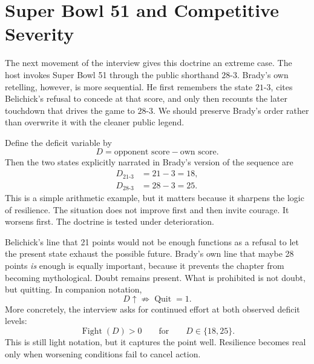 \section{Super Bowl 51 and Competitive Severity}

The next movement of the interview gives this doctrine an extreme case. The host invokes Super Bowl 51 through the public shorthand \(28\text{-}3\). Brady's own retelling, however, is more sequential. He first remembers the state \(21\text{-}3\), cites Belichick's refusal to concede at that score, and only then recounts the later touchdown that drives the game to \(28\text{-}3\). We should preserve Brady's order rather than overwrite it with the cleaner public legend.

Define the deficit variable by
\begin{equation}
D=\text{opponent score}-\text{own score}.
\end{equation}
Then the two states explicitly narrated in Brady's version of the sequence are
\begin{align}
D_{21\text{-}3} &= 21-3 = 18,\\
D_{28\text{-}3} &= 28-3 = 25.
\end{align}
This is a simple arithmetic example, but it matters because it sharpens the logic of resilience. The situation does not improve first and then invite courage. It worsens first. The doctrine is tested under deterioration.

Belichick's line that 21 points would not be enough functions as a refusal to let the present state exhaust the possible future. Brady's own line that maybe 28 points \emph{is} enough is equally important, because it prevents the chapter from becoming mythological. Doubt remains present. What is prohibited is not doubt, but quitting. In companion notation,
\begin{equation}
D \uparrow \not\Rightarrow \operatorname{Quit}=1.
\end{equation}
More concretely, the interview asks for continued effort at both observed deficit levels:
\begin{equation}
\operatorname{Fight}(D)>0
\qquad
\text{for}
\qquad
D \in \{18,25\}.
\end{equation}
This is still light notation, but it captures the point well. Resilience becomes real only when worsening conditions fail to cancel action.

